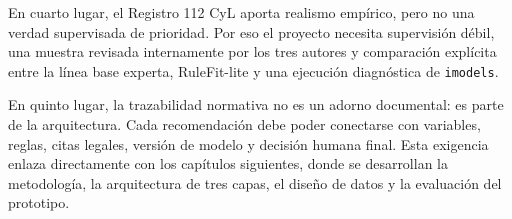En cuarto lugar, el Registro 112 CyL aporta realismo empírico, pero no una verdad supervisada de prioridad. Por eso el proyecto necesita supervisión débil, una muestra revisada internamente por los tres autores y comparación explícita entre la línea base experta, RuleFit-lite y una ejecución diagnóstica de \texttt{imodels}.

En quinto lugar, la trazabilidad normativa no es un adorno documental: es parte de la arquitectura. Cada recomendación debe poder conectarse con variables, reglas, citas legales, versión de modelo y decisión humana final. Esta exigencia enlaza directamente con los capítulos siguientes, donde se desarrollan la metodología, la arquitectura de tres capas, el diseño de datos y la evaluación del prototipo.
